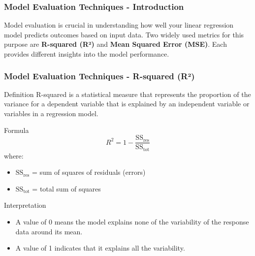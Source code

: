\documentclass[aspectratio=169]{beamer}
\begin{document}
\begin{frame}[fragile]
    \frametitle{Model Evaluation Techniques - Introduction}
    Model evaluation is crucial in understanding how well your linear regression model predicts outcomes based on input data. Two widely used metrics for this purpose are 
    \textbf{R-squared (R²)} and \textbf{Mean Squared Error (MSE)}. Each provides different insights into the model performance.
\end{frame}

\begin{frame}[fragile]
    \frametitle{Model Evaluation Techniques - R-squared (R²)}
    \begin{block}{Definition}
        R-squared is a statistical measure that represents the proportion of the variance for a dependent variable that is explained by an independent variable or variables in a regression model.
    \end{block}

    \begin{block}{Formula}
        \[
        R^2 = 1 - \frac{\text{SS}_{\text{res}}}{\text{SS}_{\text{tot}}}
        \]
        where:
        \begin{itemize}
            \item \(\text{SS}_{\text{res}}\) = sum of squares of residuals (errors)
            \item \(\text{SS}_{\text{tot}}\) = total sum of squares
        \end{itemize}
    \end{block}

    \begin{block}{Interpretation}
        \begin{itemize}
            \item A value of 0 means the model explains none of the variability of the response data around its mean.
            \item A value of 1 indicates that it explains all the variability.
        \end{itemize}
    \end{block}
\end{frame}
\end{document}
